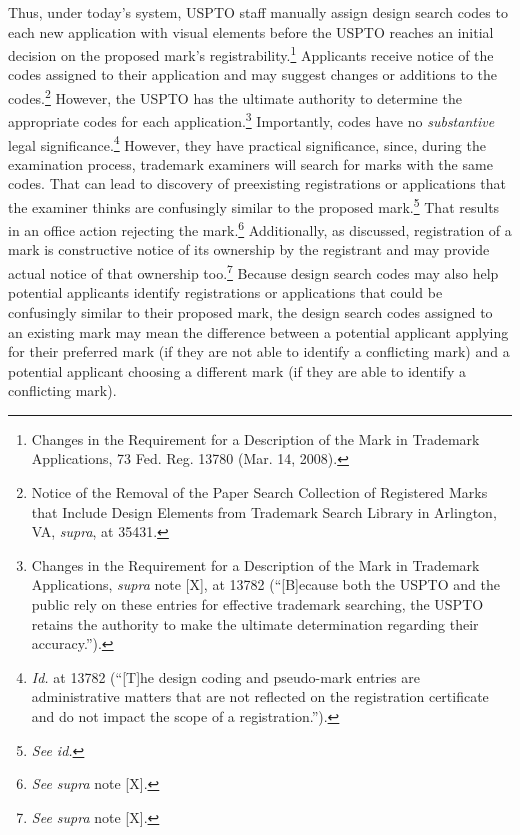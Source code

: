 \documentclass[letterpaper, 11pt, oneside]{article}
\begin{document}
Thus, under today's system, USPTO staff manually assign design search codes to each new application with visual elements before the USPTO reaches an initial decision on the proposed mark's registrability.\footnote{Changes in the Requirement for a Description of the Mark in Trademark Applications, 73 Fed. Reg. 13780 (Mar. 14, 2008).} Applicants receive notice of the codes assigned to their application and may suggest changes or additions to the codes.\footnote{Notice of the Removal of the Paper Search Collection of Registered Marks that Include Design Elements from Trademark Search Library in Arlington, VA, \textit{supra}, at 35431.} However, the USPTO has the ultimate authority to determine the appropriate codes for each application.\footnote{Changes in the Requirement for a Description of the Mark in Trademark Applications, \textit{supra} note [X], at 13782 (``[B]ecause both the USPTO and the public rely on these entries for effective trademark searching, the USPTO retains the authority to make the ultimate determination regarding their accuracy.'').} Importantly, codes have no \textit{substantive} legal significance.\footnote{\textit{Id.} at 13782 (``[T]he design coding and pseudo-mark entries are administrative matters that are not reflected on the registration certificate and do not impact the scope of a registration.'').} However, they have practical significance, since, during the examination process, trademark examiners will search for marks with the same codes. That can lead to discovery of preexisting registrations or applications that the examiner thinks are confusingly similar to the proposed mark.\footnote{\textit{See id.}} That results in an office action rejecting the mark.\footnote{\textit{See supra} note [X].} Additionally, as discussed, registration of a mark is constructive notice of its ownership by the registrant and may provide actual notice of that ownership too.\footnote{\textit{See supra} note [X].}  Because design search codes may also help potential applicants identify registrations or applications that could be confusingly similar to their proposed mark, the design search codes assigned to an existing mark may mean the difference between a potential applicant applying for their preferred mark (if they are not able to identify a conflicting mark) and a potential applicant choosing a different mark (if they are able to identify a conflicting mark).
\end{document}

